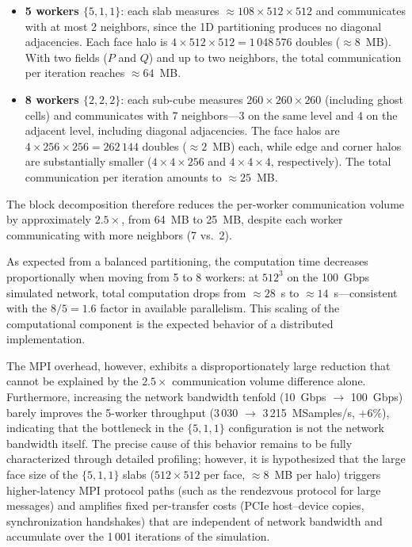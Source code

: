 \documentclass[cic,tc,english]{infufrgs}
\begin{document}
\begin{itemize}
  \item \textbf{5 workers $\{5,1,1\}$}: each slab measures
    $\approx 108 \times 512 \times 512$ and
    communicates with at most 2 neighbors, since the 1D partitioning
    produces no diagonal adjacencies. Each face halo is $4 \times
    512 \times 512 = 1\,048\,576$ doubles ($\approx 8$~MB). With two
    fields ($P$ and $Q$) and up to two neighbors, the total
    communication per iteration reaches $\approx 64$~MB.
  \item \textbf{8 workers $\{2,2,2\}$}: each sub-cube measures
    $260 \times 260 \times 260$ (including ghost cells) and
    communicates with 7 neighbors---3 on the same level and 4 on the
    adjacent level, including diagonal adjacencies. The face halos
    are $4 \times 256 \times 256 = 262\,144$ doubles ($\approx 2$~MB)
    each, while edge and corner halos are substantially smaller
    ($4 \times 4 \times 256$ and $4 \times 4 \times 4$, respectively).
    The total communication per iteration amounts to $\approx 25$~MB.
\end{itemize}

The block decomposition therefore reduces the per-worker communication
volume by approximately $2.5\times$, from 64~MB to 25~MB, despite
each worker communicating with more neighbors (7 vs.\ 2).

As expected from a balanced partitioning, the computation time
decreases proportionally when moving from 5 to 8 workers: at $512^3$
on the 100~Gbps simulated network, total computation drops from
$\approx 28$~s to $\approx 14$~s---consistent with the $8/5 = 1.6$
factor in available parallelism. This scaling of the computational
component is the expected behavior of a distributed implementation.

The MPI overhead, however, exhibits a disproportionately large
reduction that cannot be explained by the $2.5\times$ communication
volume difference alone. Furthermore, increasing the network bandwidth
tenfold (10~Gbps $\to$ 100~Gbps) barely improves the 5-worker
throughput (3\,030 $\to$ 3\,215~MSamples/s, $+6\%$), indicating that
the bottleneck in the $\{5,1,1\}$ configuration is not the network
bandwidth itself. The precise cause of this behavior remains to be
fully characterized through detailed profiling; however, it is
hypothesized that the large face size of the $\{5,1,1\}$ slabs
($512 \times 512$ per face, $\approx 8$~MB per halo) triggers
higher-latency MPI protocol paths (such as the rendezvous protocol
for large messages) and amplifies fixed per-transfer costs (PCIe
host--device copies, synchronization handshakes) that are independent
of network bandwidth and accumulate over the 1\,001 iterations of
the simulation.
\end{document}
